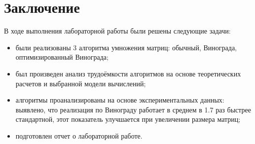 \chapter*{Заключение}


В ходе выполнения лабораторной работы были решены следующие задачи:

\begin{itemize}
	\item были реализованы 3 алгоритма умножения матриц: обычный, Винограда, оптимизированный Винограда;
	\item был произведен анализ трудоёмкости алгоритмов на основе теоретических расчетов и выбранной модели вычислений;
	\item алгоритмы проанализированы на основе экспериментальных данных: выявлено, что реализация по Винограду работает в среднем в 1.7 раз быстрее стандартной, этот показатель улучшается при увеличении размера матриц;

	\item подготовлен отчет о лабораторной работе.
\end{itemize}
